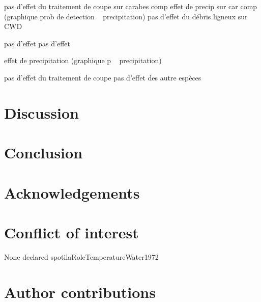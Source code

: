 pas d'effet du traitement de coupe sur carabes comp
effet de precip sur car comp (graphique prob de detection ~ precipitation)
pas d'effet du débris ligneux sur CWD

pas d'effet
pas d'effet

effet de precipitation (graphique p ~ precipitation)

 pas d'effet du traitement de coupe
 pas d'effet des autre espèces




\clearpage

\section*{Discussion}
\label{sec:discu1}

\section*{Conclusion}
\label{sec:conclu1}

\section*{Acknowledgements}
\label{sec:acknowl1}

\section*{Conflict of interest}
\label{sec:conflict1}

None declared
spotilaRoleTemperatureWater1972
\section*{Author contributions}
\label{sec:author1}

\cleardoublepage

\begin{otherlanguage}{english}

\end{otherlanguage}
